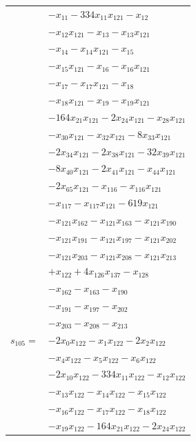 \begin{longtable}{@{}r@{\;}l@{}}
 & \(\displaystyle -x_{11} -334x_{11}x_{121} -x_{12}\) \\
 & \(\displaystyle -x_{12}x_{121} -x_{13} -x_{13}x_{121}\) \\
 & \(\displaystyle -x_{14} -x_{14}x_{121} -x_{15}\) \\
 & \(\displaystyle -x_{15}x_{121} -x_{16} -x_{16}x_{121}\) \\
 & \(\displaystyle -x_{17} -x_{17}x_{121} -x_{18}\) \\
 & \(\displaystyle -x_{18}x_{121} -x_{19} -x_{19}x_{121}\) \\
 & \(\displaystyle -164x_{21}x_{121} -2x_{24}x_{121} -x_{28}x_{121}\) \\
 & \(\displaystyle -x_{30}x_{121} -x_{32}x_{121} -8x_{33}x_{121}\) \\
 & \(\displaystyle -2x_{34}x_{121} -2x_{38}x_{121} -32x_{39}x_{121}\) \\
 & \(\displaystyle -8x_{40}x_{121} -2x_{41}x_{121} -x_{44}x_{121}\) \\
 & \(\displaystyle -2x_{65}x_{121} -x_{116} -x_{116}x_{121}\) \\
 & \(\displaystyle -x_{117} -x_{117}x_{121} -619x_{121}\) \\
 & \(\displaystyle -x_{121}x_{162} -x_{121}x_{163} -x_{121}x_{190}\) \\
 & \(\displaystyle -x_{121}x_{191} -x_{121}x_{197} -x_{121}x_{202}\) \\
 & \(\displaystyle -x_{121}x_{203} -x_{121}x_{208} -x_{121}x_{213}\) \\
 & \(\displaystyle +x_{122} +4x_{126}x_{137} -x_{128}\) \\
 & \(\displaystyle -x_{162} -x_{163} -x_{190}\) \\
 & \(\displaystyle -x_{191} -x_{197} -x_{202}\) \\
 & \(\displaystyle -x_{203} -x_{208} -x_{213}\) \\[3pt]
\(s_{105}=\) & \(\displaystyle -2x_{0}x_{122} -x_{1}x_{122} -2x_{2}x_{122}\) \\
 & \(\displaystyle -x_{4}x_{122} -x_{5}x_{122} -x_{6}x_{122}\) \\
 & \(\displaystyle -2x_{10}x_{122} -334x_{11}x_{122} -x_{12}x_{122}\) \\
 & \(\displaystyle -x_{13}x_{122} -x_{14}x_{122} -x_{15}x_{122}\) \\
 & \(\displaystyle -x_{16}x_{122} -x_{17}x_{122} -x_{18}x_{122}\) \\
 & \(\displaystyle -x_{19}x_{122} -164x_{21}x_{122} -2x_{24}x_{122}\) \\

\end{longtable}

